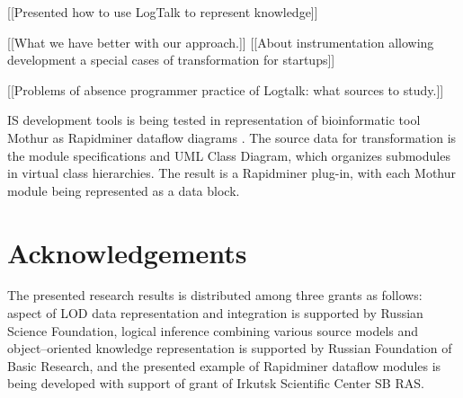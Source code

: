 \documentclass[conference]{IEEEtran}
\begin{document}
[[Presented how to use LogTalk to represent knowledge]]

[[What we have better with our approach.]] [[About instrumentation allowing development a special cases of transformation for startups]]

[[Problems of absence programmer practice of Logtalk: what sources to study.]]

IS development tools is being tested in representation of bioinformatic tool Mothur as Rapidminer dataflow diagrams \cite{dataflow}.  The source data for transformation is the module specifications and UML Class Diagram, which organizes submodules in virtual class hierarchies.  The result is a Rapidminer plug-in, with each Mothur module being represented as a data block.

\section{Acknowledgements}
\label{sec:ack-descr}

The presented research results is distributed among three grants as follows: aspect of LOD data representation and integration is supported by Russian Science Foundation, logical inference combining various source models and object--oriented knowledge representation is supported by Russian Foundation of Basic Research, and the presented example of Rapidminer dataflow modules is being developed with support of grant of Irkutsk Scientific Center SB RAS.
\end{document}
